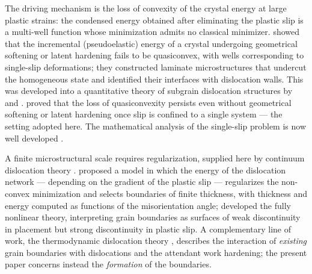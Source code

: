 \documentclass[12pt]{article}
\theoremstyle{plain}
\theoremstyle{definition}
\begin{document}
The driving mechanism is the loss of convexity of the crystal energy at large plastic strains: the condensed energy obtained after eliminating the plastic slip is a multi-well function whose minimization admits no classical minimizer. \citet{ortiz1999nonconvex} showed that the incremental (pseudoelastic) energy of a crystal undergoing geometrical softening or latent hardening fails to be quasiconvex, with wells corresponding to single-slip deformations; they constructed laminate microstructures that undercut the homogeneous state and identified their interfaces with dislocation walls. This was developed into a quantitative theory of subgrain dislocation structures by \citet{ortiz2000theory} and \citet{aubry2003the}. \citet{carstensen2002non} proved that the loss of quasiconvexity persists even without geometrical softening or latent hardening once slip is confined to a single system — the setting adopted here. The mathematical analysis of the single-slip problem is now well developed \citep{dacorogna2008direct,conti2005single,conti2005dislocation,conti2016relaxation,conti2021optimal}.

A finite microstructural scale requires regularization, supplied here by continuum dislocation theory \citep{nye1953some,bilby1955types,kroner1955fundamentale,berdichevsky1967dynamic,berdichevsky2006continuum,bilby1958continuous,berdichevsky2006thermodynamics}. \citet{koster2015bformation} proposed a model in which the energy of the dislocation network --- depending on the gradient of the plastic slip --- regularizes the non-convex minimization and selects boundaries of finite thickness, with thickness and energy computed as functions of the misorientation angle; \citet{koster2015aformation} developed the fully nonlinear theory, interpreting grain boundaries as surfaces of weak discontinuity in placement but strong discontinuity in plastic slip. A complementary line of work, the thermodynamic dislocation theory \citep{le2018dthermodynamic,piao2021dislocation,piao2022thermodynamic}, describes the interaction of \emph{existing} grain boundaries with dislocations and the attendant work hardening; the present paper concerns instead the \emph{formation} of the boundaries.
\end{document}

